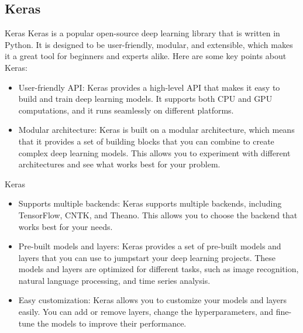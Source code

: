 \documentclass[11pt]{beamer}
\begin{document}
\subsection{Keras \\ \scalebox{0.8}{}}
%
\begin{frame}{Keras}
Keras is a popular open-source deep learning library that is written in Python. It is designed to be user-friendly, modular, and extensible, which makes it a great tool for beginners and experts alike. Here are some key points about Keras:
\begin{itemize}
\item User-friendly API: Keras provides a high-level API that makes it easy to build and train deep learning models. It supports both CPU and GPU computations, and it runs seamlessly on different platforms.
\item Modular architecture: Keras is built on a modular architecture, which means that it provides a set of building blocks that you can combine to create complex deep learning models. This allows you to experiment with different architectures and see what works best for your problem.
\end{itemize}
\end{frame}
\begin{frame}{Keras}
\begin{itemize}
\item Supports multiple backends: Keras supports multiple backends, including TensorFlow, CNTK, and Theano. This allows you to choose the backend that works best for your needs.
\item Pre-built models and layers: Keras provides a set of pre-built models and layers that you can use to jumpstart your deep learning projects. These models and layers are optimized for different tasks, such as image recognition, natural language processing, and time series analysis.
\item Easy customization: Keras allows you to customize your models and layers easily. You can add or remove layers, change the hyperparameters, and fine-tune the models to improve their performance.
\end{itemize}
\end{frame}
\end{document}
